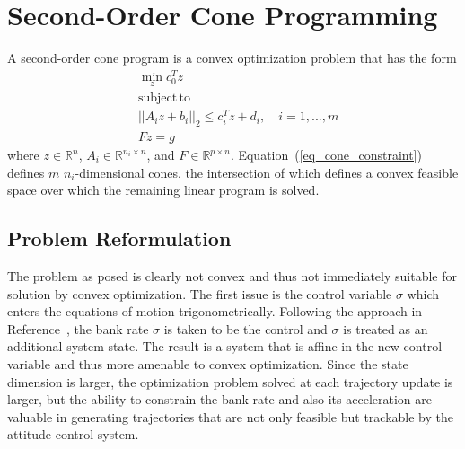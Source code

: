 \documentclass[letterpaper, preprint, paper,11pt]{AAS}	%
\begin{document}
	
	\section{Second-Order Cone Programming}
	A second-order cone program is a convex optimization problem that has the form\cite{BoydConvexBook} 
	\begin{align}
	&\min_z c_0^Tz \label{eq_socp_obj}\\
	&\mathrm{subject\,to\,}\nonumber\\ 
	&||A_iz+b_i||_2\le c_i^Tz + d_i,\quad i=1,...,m \label{eq_cone_constraint}\\
	&Fz=g \label{eq_lin_eq_constraint}
	\end{align}
	where $z\in\mathbb{R}^n$, $A_i\in\mathbb{R}^{n_i\times n}$, and $F\in\mathbb{R}^{p\times n}$. Equation~(\ref{eq_cone_constraint}) defines $m$ $n_i$-dimensional cones, the intersection of which defines a convex feasible space over which the remaining linear program is solved. 
	
	\subsection{Problem Reformulation}
	The problem as posed is clearly not convex and thus not immediately suitable for solution by convex optimization. The first issue is the control variable $\sigma$ which enters the equations of motion trigonometrically. Following the approach in Reference~, the bank rate $\dot{\sigma}$ is taken to be the control and $\sigma$ is treated as an additional system state. The result is a system that is affine in the new control variable and thus more amenable to convex optimization. Since the state dimension is larger, the optimization problem solved at each trajectory update is larger, but the ability to constrain the bank rate and also its acceleration are valuable in generating trajectories that are not only feasible but trackable by the attitude control system. 
	
\end{document}
